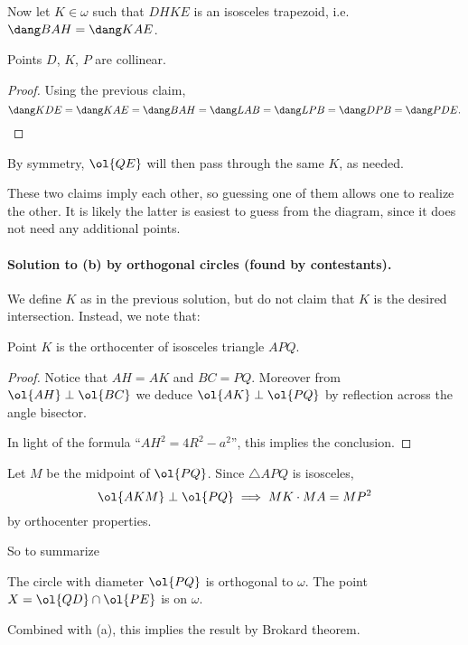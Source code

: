 \documentclass[11pt]{scrartcl}
\begin{document}
Now let $K \in \omega$ such that $DHKE$ is an isosceles trapezoid,
i.e.\ $\dang BAH = \dang KAE$.
\begin{claim*}
  Points $D$, $K$, $P$ are collinear.
\end{claim*}
\begin{proof}
  Using the previous claim,
  \[ \dang KDE = \dang KAE = \dang BAH = \dang LAB
    = \dang LPB = \dang DPB = \dang PDE. \qedhere \]
\end{proof}

By symmetry, $\ol{QE}$ will then pass through the same $K$, as needed.
\begin{remark*}
  These two claims imply each other,
  so guessing one of them allows one to realize the other.
  It is likely the latter is easiest to guess from the diagram,
  since it does not need any additional points.
\end{remark*}

\paragraph{Solution to (b) by orthogonal circles (found by contestants).}
We define $K$ as in the previous solution,
but do not claim that $K$ is the desired intersection.
Instead, we note that:

\begin{claim*}
  Point $K$ is the orthocenter of isosceles triangle $APQ$.
\end{claim*}
\begin{proof}
  Notice that $AH = AK$ and $BC = PQ$.
  Moreover from $\ol{AH} \perp \ol{BC}$
  we deduce $\ol{AK} \perp \ol{PQ}$ by reflection
  across the angle bisector.

  In light of the formula ``$AH^2 = 4R^2 - a^2$'', this implies the conclusion.
\end{proof}

Let $M$ be the midpoint of $\ol{PQ}$.
Since $\triangle APQ$ is isosceles,
\[ \ol{AKM} \perp \ol{PQ} \implies MK \cdot MA = MP^2 \]
by orthocenter properties.

So to summarize
\begin{itemize}
  \ii The circle with diameter $\ol{PQ}$ is orthogonal to $\omega$.
  \ii The point $X = \ol{QD} \cap \ol{PE}$ is on $\omega$.
\end{itemize}
Combined with (a), this implies the result by Brokard theorem.
\end{document}
